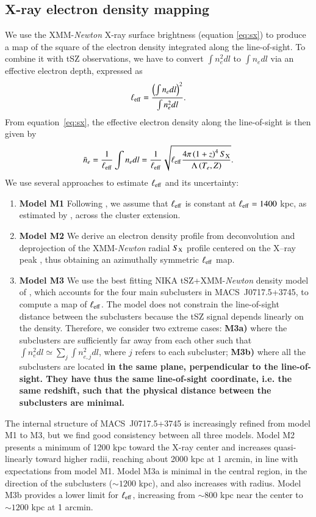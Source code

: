 \documentclass[twocolumn,traditabstract]{aa}
\begin{document}
\subsection{X-ray electron density mapping}
We use the XMM-\textit{Newton} X-ray surface brightness (equation \ref{eq:sx}) to produce a map of the square of the electron density integrated along the line-of-sight. To combine it with tSZ observations, we have to convert $\int n_e^2 dl$ to $\int n_e dl$ via an effective electron depth, expressed as
\begin{equation}
	\ell_{\rm eff} = \frac{\left(\int n_e dl\right)^2}{\int n_e^2 dl}.
\label{eq:l_eff}
\end{equation}
From equation~\ref{eq:sx}, the effective electron density along the line-of-sight is then given by
\begin{equation}
	\bar{n}_e = \frac{1}{\ell_{\rm eff}} \int n_e dl = \frac{1}{\ell_{\rm eff}}\sqrt{\ell_{\rm eff} \frac{4 \pi \left(1+z\right)^4 S_{\rm X}}{\Lambda\left(T_e, Z\right)}}.
\label{eq:pseudo_ne}
\end{equation}
We use several approaches to estimate $\ell_{\rm eff}$ and its uncertainty:
\begin{enumerate}
\item {\bf Model M1} Following \cite{Sayers2013}, we assume that $\ell_{\rm eff}$ is constant at $\ell_{\rm eff}=1400$ kpc, as estimated by \citet{Mroczkowski2012}, across the cluster extension. 
\item {\bf Model M2} We derive an electron density profile from deconvolution and deprojection of the XMM-\textit{Newton} radial $S_{\rm X}$ profile centered on the X--ray peak \citep{Croston2006}, thus obtaining an azimuthally symmetric $\ell_{\rm eff}$ map. 
\item {\bf Model M3} We use the best fitting NIKA tSZ+XMM-\textit{Newton} density model of \cite{Adam2016b}, which accounts for the four main subclusters in \mbox{MACS~J0717.5+3745}, to compute a map of $\ell_{\rm eff}$. The model does not constrain the line-of-sight distance between the subclusters because the tSZ signal depends linearly on the density. Therefore, we consider two extreme cases: {\bf M3a)} where the subclusters are sufficiently far away from each other such that $\int n_e^2 dl \simeq \sum_j \int n_{e,j}^2 dl$, where $j$ refers to each subcluster; {\bf M3b)} where all the subclusters are located {\bf in the same plane, perpendicular to the line-of-sight. They have thus the same line-of-sight coordinate, i.e. the same redshift, such that the physical distance between the subclusters are minimal.}
\end{enumerate}
The internal structure of \mbox{MACS~J0717.5+3745} is increasingly refined from model M1 to M3, but we find good consistency between all three models. Model M2 presents a minimum of 1200 kpc toward the X-ray center and increases quasi-linearly toward higher radii, reaching about 2000 kpc at 1 arcmin, in line with expectations from model M1. Model M3a is minimal in the central region, in the direction of the subclusters ($\sim 1200$ kpc), and also increases with radius. Model M3b provides a lower limit for $\ell_{\rm eff}$, increasing from $\sim 800$ kpc near the center to $\sim 1200$ kpc at 1 arcmin. 
\end{document}
